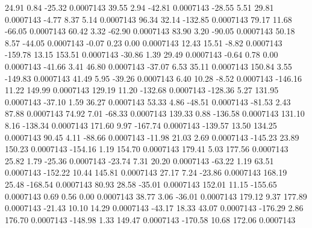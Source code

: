        24.91        0.84      -25.32     0.0007143
       39.55        2.94      -42.81     0.0007143
      -28.55        5.51       29.81     0.0007143
       -4.77        8.37        5.14     0.0007143
       96.34       32.14     -132.85     0.0007143
       79.17       11.68      -66.05     0.0007143
       60.42        3.32      -62.90     0.0007143
       83.90        3.20      -90.05     0.0007143
       50.18        8.57      -44.05     0.0007143
       -0.07        0.23        0.00     0.0007143
       12.43       15.51       -8.82     0.0007143
     -159.78       13.15      153.51     0.0007143
      -30.86        1.39       29.49     0.0007143
       -0.64        0.78        0.00     0.0007143
      -41.66        3.41       46.80     0.0007143
      -37.07        6.53       35.11     0.0007143
      150.84        3.55     -149.83     0.0007143
       41.49        5.95      -39.26     0.0007143
        6.40       10.28       -8.52     0.0007143
     -146.16       11.22      149.99     0.0007143
      129.19       11.20     -132.68     0.0007143
     -128.36        5.27      131.95     0.0007143
      -37.10        1.59       36.27     0.0007143
       53.33        4.86      -48.51     0.0007143
      -81.53        2.43       87.88     0.0007143
       74.92        7.01      -68.33     0.0007143
      139.33        0.88     -136.58     0.0007143
      131.10        8.16     -138.34     0.0007143
      171.60        9.97     -167.74     0.0007143
     -139.57       13.50      134.25     0.0007143
       90.45        4.11      -88.66     0.0007143
      -11.98       21.03        2.69     0.0007143
     -145.23       23.89      150.23     0.0007143
     -154.16        1.19      154.70     0.0007143
      179.41        5.03      177.56     0.0007143
       25.82        1.79      -25.36     0.0007143
      -23.74        7.31       20.20     0.0007143
      -63.22        1.19       63.51     0.0007143
     -152.22       10.44      145.81     0.0007143
       27.17        7.24      -23.86     0.0007143
      168.19       25.48     -168.54     0.0007143
       80.93       28.58      -35.01     0.0007143
      152.01       11.15     -155.65     0.0007143
        0.69        0.56        0.00     0.0007143
       38.77        3.06      -36.01     0.0007143
      179.12        9.37      177.89     0.0007143
      -21.43       10.10       14.29     0.0007143
      -43.17       18.33       43.07     0.0007143
     -176.29        2.86      176.70     0.0007143
     -148.98        1.33      149.47     0.0007143
     -170.58       10.68      172.06     0.0007143
